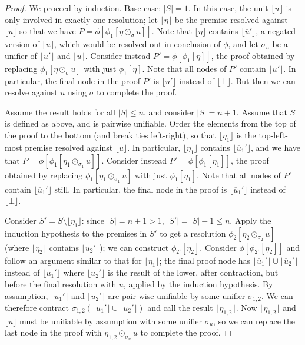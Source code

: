 \documentclass[12pt]{article}
\theoremstyle{definition}
\theoremstyle{remark}
\newcommand{\clause}[1]{ \lfloor{#1} \rfloor}
\begin{document}
\begin{proof}
We proceed by induction. Base case: $|S|=1$. In this case, the unit $\clause{u}$ is only involved in exactly one resolution; let $\clause{\eta}$ be the premise resolved against $\clause{u}$ so that we have $P=\phi[\phi_1[\eta \odot_{\sigma} u]]$. Note that $\clause{\eta}$ contains $\clause{\overline{u}'}$, a negated version of $\clause{u}$, which would be resolved out in conclusion of $\phi$, and let $\sigma_u$ be a unifier of $\clause{\overline{u}'}$ and $\clause{u}$. Consider instead $P'=\phi[\phi_1[\eta]]$, the proof obtained by replacing $\phi_1[\eta \odot_{\sigma} u]$ with just $\phi_1[\eta]$. Note that all nodes of $P'$ contain $\clause{\overline{u}'}$. In particular, the final node in the proof $P'$ is $\clause{\overline{u}'}$ instead of $\clause{\bot}$. But then we can resolve against $u$ using $\sigma$ to complete the proof.

Assume the result holds for all $|S|\le n$, and consider $|S|=n+1$. Assume that $S$ is defined as above, and is pairwise unifiable. Order the elements from the top of the proof to the bottom (and break ties left-right), so that $\clause{\eta_1}$ is the top-left-most premise resolved against $\clause{u}$. In particular, $\clause{\eta_1}$ contains $\clause{\overline{u}_1'}$, and we have that $P=\phi[\phi_1[\eta_1 \odot_{\sigma_1} u]]$. Consider instead $P'=\phi[\phi_{1}[\eta_1]]$, the proof obtained by replacing $\phi_1[\eta_1 \odot_{\sigma_1} u]$ with just $\phi_{1}[\eta_1]$. Note that all nodes of $P'$ contain $\clause{\overline{u}_1'}$ still. In particular, the final node in the proof is $\clause{\overline{u}_1'}$ instead of $\clause{\bot}$.  

Consider $S'=S\setminus\clause{\eta_1}$: since $|S|=n+1>1$, $|S'| = |S|-1 \le n$. Apply the induction hypothesis to the premises in $S'$ to get a  resolution $\phi_2[\eta_2 \odot_{\sigma_2} u]$ (where $\clause{\eta_2}$ contains $\clause{\overline{u}_2'}$);  we can construct $\phi_{2'}[\eta_2]$. Consider  $\phi[\phi_{2'}[\eta_2]]$ and follow an argument similar to that for $\clause{\eta_1}$; the final proof node has $\clause{\overline{u}_1'} \cup \clause{\overline{u}_2'}$ instead of $\clause{\overline{u}_1'}$ where $\clause{\overline{u}_2'}$ is the result of the lower, after contraction, but before the final resolution with $u$, applied by the induction hypothesis.  By assumption, $\clause{\overline{u}_1'}$ and $\clause{\overline{u}_2'}$ are pair-wise unifiable by some unifier $\sigma_{1,2}$. We can therefore contract $\sigma_{1,2}(\clause{\overline{u}_1'} \cup \clause{\overline{u}_2'})$ and call the result $\clause{\eta_{1,2}}$. Now $\clause{\eta_{1,2}}$ and $\clause{u}$ must be unifiable by assumption with some unifier $\sigma_u$, so we can replace the last node in the proof with $\eta_{1,2}\odot_{\sigma_u} u$ to complete the proof.
\end{proof}
\end{document}
